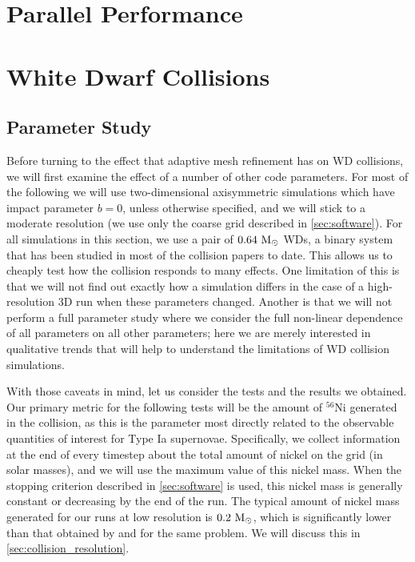 \documentclass[12pt]{article}
\begin{document}
\newpage
\section{Parallel Performance}
\label{sec:performance}



\newpage
\section{White Dwarf Collisions}
\label{sec:collisions}

\subsection{Parameter Study}
\label{sec:collision_parameters}

Before turning to the effect that adaptive mesh refinement has on WD collisions,
we will first examine the effect of a number of other code parameters. For most
of the following we will use two-dimensional axisymmetric simulations which have
impact parameter $b = 0$, unless otherwise specified, and we will stick to a
moderate resolution (we use only the coarse grid described in \autoref{sec:software}).
For all simulations in this section, we use a pair of $0.64\ \msolar$ WDs, a binary
system that has been studied in most of the collision papers to date. This allows
us to cheaply test how the collision responds to many effects. One limitation of
this is that we will not find out exactly how a simulation differs in the case of a
high-resolution 3D run when these parameters changed. Another is that we will not
perform a full parameter study where we consider the full non-linear dependence of
all parameters on all other parameters; here we are merely interested in qualitative
trends that will help to understand the limitations of WD collision simulations.

With those caveats in mind, let us consider the tests and the results we obtained.
Our primary metric for the following tests will be the amount of $^{56}$Ni generated
in the collision, as this is the parameter most directly related to the observable
quantities of interest for Type Ia supernovae. Specifically, we collect information
at the end of every timestep about the total amount of nickel on the grid (in solar
masses), and we will use the maximum value of this nickel mass. When the stopping
criterion described in \autoref{sec:software} is used, this nickel mass is generally
constant or decreasing by the end of the run. The typical amount of nickel mass generated
for our runs at low resolution is $0.2\ \mathrm{M}_\odot$, which is significantly lower than
that obtained by \cite{raskin:2010} and \cite{kushnir:2013} for the same problem.
We will discuss this in \autoref{sec:collision_resolution}.
\end{document}
